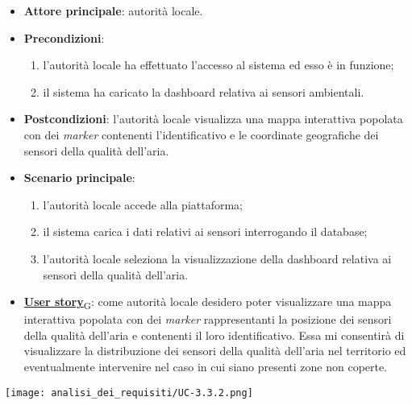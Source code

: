 \begin{itemize}
	\item \textbf{Attore principale}: autorità locale.
	\item \textbf{Precondizioni}:
	      \begin{enumerate}
		      \item l'autorità locale ha effettuato l'accesso al sistema ed esso è in funzione;
		      \item il sistema ha caricato la dashboard relativa ai sensori ambientali.
	      \end{enumerate}
	\item \textbf{Postcondizioni}: l'autorità locale visualizza una mappa interattiva popolata con dei \textit{marker} contenenti l'identificativo e le coordinate geografiche dei sensori della qualità dell'aria.
	\item \textbf{Scenario principale}:
	      \begin{enumerate}
		      \item l'autorità locale accede alla piattaforma;
		      \item il sistema carica i dati relativi ai sensori interrogando il database;
		      \item l'autorità locale seleziona la visualizzazione della dashboard relativa ai sensori della qualità dell'aria.
	      \end{enumerate}
	\item \href{https://7last.github.io/docs/pb/documentazione-interna/glossario\#user-story}{\textbf{User story}\textsubscript{G}}:
	      come autorità locale desidero poter visualizzare una mappa interattiva popolata con dei \textit{marker} rappresentanti la posizione dei sensori della qualità dell'aria
	      e contenenti il loro identificativo. Essa mi consentirà di visualizzare la distribuzione dei sensori della qualità dell'aria nel territorio ed eventualmente intervenire nel caso in cui siano presenti zone non coperte.
\end{itemize}
\begin{center}
	\texttt{[image: analisi\_dei\_requisiti/UC-3.3.2.png]}
\end{center}


